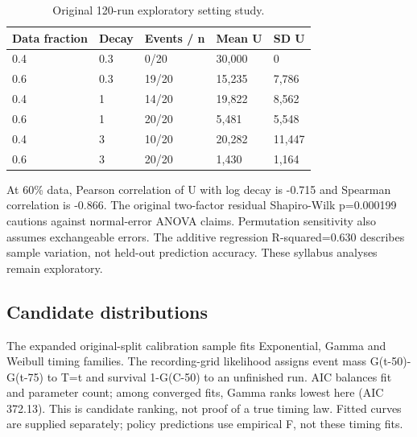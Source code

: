 \documentclass[conference,letterpaper]{IEEEtran}
\begin{document}
\begin{table}[!t]

\caption{Original 120-run exploratory setting study.}

\centering\footnotesize

\begin{tabularx}{\textwidth}{XXXXX}

\toprule

Data fraction & Decay & Events / n & Mean U & SD U\\

\midrule

0.4 & 0.3 & 0/20 & 30,000 & 0\\

0.6 & 0.3 & 19/20 & 15,235 & 7,786\\

0.4 & 1 & 14/20 & 19,822 & 8,562\\

0.6 & 1 & 20/20 & 5,481 & 5,548\\

0.4 & 3 & 10/20 & 20,282 & 11,447\\

0.6 & 3 & 20/20 & 1,430 & 1,164\\

\bottomrule

\end{tabularx}

\end{table}

At 60\% data, Pearson correlation of U with log decay is -0.715 and Spearman correlation is -0.866. The original two-factor residual Shapiro-Wilk p=0.000199 cautions against normal-error ANOVA claims. Permutation sensitivity also assumes exchangeable errors. The additive regression R-squared=0.630 describes sample variation, not held-out prediction accuracy. These syllabus analyses remain exploratory.

\subsection{Candidate distributions}

The expanded original-split calibration sample fits Exponential, Gamma and Weibull timing families. The recording-grid likelihood assigns event mass G(t-50)-G(t-75) to T=t and survival 1-G(C-50) to an unfinished run. AIC balances fit and parameter count; among converged fits, Gamma ranks lowest here (AIC 372.13). This is candidate ranking, not proof of a true timing law. Fitted curves are supplied separately; policy predictions use empirical F, not these timing fits.
\end{document}
